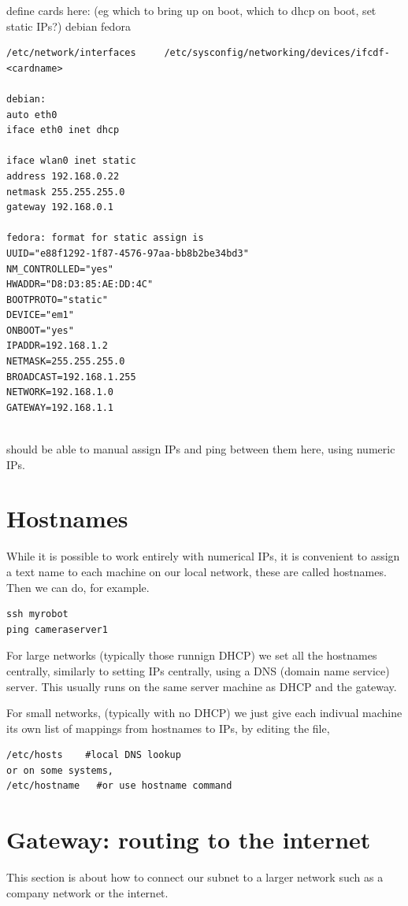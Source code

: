 \documentclass[oneside,english]{scrbook}
\begin{document}
define cards here:   (eg which to bring up on boot, which to dhcp on boot, set static IPs?) 
debian              fedora 
\begin{lstlisting}
/etc/network/interfaces     /etc/sysconfig/networking/devices/ifcdf-<cardname>  

debian:
auto eth0
iface eth0 inet dhcp 

iface wlan0 inet static
address 192.168.0.22
netmask 255.255.255.0
gateway 192.168.0.1

fedora: format for static assign is 
UUID="e88f1292-1f87-4576-97aa-bb8b2be34bd3" 
NM_CONTROLLED="yes" 
HWADDR="D8:D3:85:AE:DD:4C" 
BOOTPROTO="static"
DEVICE="em1"
ONBOOT="yes"
IPADDR=192.168.1.2
NETMASK=255.255.255.0
BROADCAST=192.168.1.255
NETWORK=192.168.1.0
GATEWAY=192.168.1.1
    
\end{lstlisting}

should be able to manual assign IPs and ping between them here, using numeric IPs.

\section{Hostnames}

While it is possible to work entirely with numerical IPs, it is convenient to assign a text name to each machine on our local network, these are called hostnames.  Then we can do, for example.
\begin{lstlisting}
ssh myrobot
ping cameraserver1
\end{lstlisting}

For large networks (typically those runnign DHCP) we set all the hostnames centrally, similarly to setting IPs centrally, using a DNS (domain name service) server. This usually runs on the same server machine as DHCP and the gateway.

For small networks, (typically with no DHCP) we just give each indivual machine its own list of mappings from hostnames to IPs, by editing the file,
\begin{lstlisting}
/etc/hosts    #local DNS lookup 
or on some systems,
/etc/hostname   #or use hostname command 
\end{lstlisting}
  

\section{Gateway: routing to the internet}

This section is about how to connect our subnet to a larger network such as a company network or the internet. 
\end{document}
